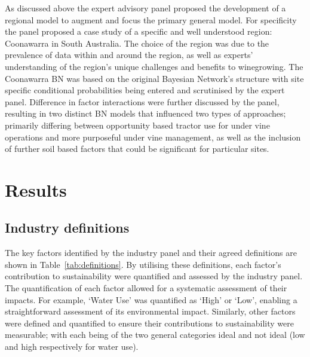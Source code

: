 \documentclass[fleqn,10pt]{wlscirep}
\begin{document}
As discussed above the expert advisory panel proposed the development of a regional model to augment and focus the primary general model. For specificity the panel proposed a case study of a specific and well understood region: Coonawarra in South Australia. The choice of the region was due to the prevalence of data within and around the region, as well as experts' understanding of the region's unique challenges and benefits to winegrowing. The Coonawarra BN was based on the original Bayesian Network's structure with site specific conditional probabilities being entered and scrutinised by the expert panel. Difference in factor interactions were further discussed by the panel, resulting in two distinct BN models that influenced two types of approaches; primarily differing between opportunity based tractor use for under vine operations and more purposeful under vine management, as well as the inclusion of further soil based factors that could be significant for particular sites.



\section*{Results}


\subsection*{Industry definitions}

The key factors identified by the industry panel and their agreed definitions are shown in Table~\ref{tab:definitions}. By utilising these definitions, each factor's contribution to sustainability were quantified and assessed by the industry panel. The quantification of each factor allowed for a systematic assessment of their impacts. For example, `Water Use' was quantified as `High' or `Low', enabling a straightforward assessment of its environmental impact. Similarly, other factors were defined and quantified to ensure their contributions to sustainability were measurable; with each being of the two general categories ideal and not ideal (low and high respectively for water use).

% 
% 
\end{document}
